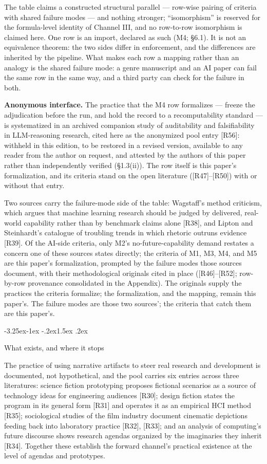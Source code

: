 \documentclass[11pt,a4paper]{article}
\makeatletter
\renewcommand\subsection{\@startsection{subsection}{2}{\z@}%
  {-3.25ex\@plus -1ex \@minus -.2ex}{1.5ex \@plus .2ex}%
  {\normalfont\large\bfseries\raggedright}}
\makeatother
\begin{document}
The table claims a constructed structural parallel — row-wise pairing of criteria with shared failure modes — and nothing stronger; ``isomorphism'' is reserved for the formula-level identity of Channel III, and no row-to-row isomorphism is claimed here. One row is an import, declared as such (M4; §6.1). It is not an equivalence theorem: the two sides differ in enforcement, and the differences are inherited by the pipeline. What makes each row a mapping rather than an analogy is the shared failure mode: a genre manuscript and an AI paper can fail the same row in the same way, and a third party can check for the failure in both.

\textbf{Anonymous interface.} The practice that the M4 row formalizes — freeze the adjudication before the run, and hold the record to a recomputability standard — is systematized in an archived companion study of auditability and falsifiability in LLM-reasoning research, cited here as the anonymized pool entry [R56]: withheld in this edition, to be restored in a revised version, available to any reader from the author on request, and attested by the authors of this paper rather than independently verified (§1.3(ii)). The row itself is this paper's formalization, and its criteria stand on the open literature ([R47]–[R50]) with or without that entry.

Two sources carry the failure-mode side of the table: Wagstaff's method criticism, which argues that machine learning research should be judged by delivered, real-world capability rather than by benchmark claims alone [R38], and Lipton and Steinhardt's catalogue of troubling trends in which rhetoric outruns evidence [R39]. Of the AI-side criteria, only M2's no-future-capability demand restates a concern one of these sources states directly; the criteria of M1, M3, M4, and M5 are this paper's formalization, prompted by the failure modes those sources document, with their methodological originals cited in place ([R46]–[R52]; row-by-row provenance consolidated in the Appendix). The originals supply the practices the criteria formalize; the formalization, and the mapping, remain this paper's. The failure modes are those two sources'; the criteria that catch them are this paper's.

\subsection{What exists, and where it stops}

The practice of using narrative artifacts to steer real research and development is documented, not hypothetical, and the pool carries six entries across three literatures: science fiction prototyping proposes fictional scenarios as a source of technology ideas for engineering audiences [R30]; design fiction states the program in its general form [R31] and operates it as an empirical HCI method [R35]; sociological studies of the film industry document cinematic depictions feeding back into laboratory practice [R32], [R33]; and an analysis of computing's future discourse shows research agendas organized by the imaginaries they inherit [R34]. Together these establish the forward channel's practical existence at the level of agendas and prototypes.
\end{document}

